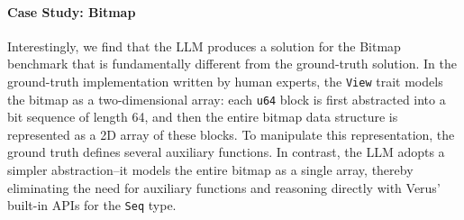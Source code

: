 \paragraph{Case Study: Bitmap}
Interestingly, we find that the LLM produces a solution for the {\sc Bitmap} benchmark that is fundamentally different from the ground-truth solution. In the ground-truth implementation written by human experts, the \texttt{View} trait models the bitmap as a two-dimensional array: each \texttt{u64} block is first abstracted into a bit sequence of length 64, and then the entire bitmap data structure is represented as a 2D array of these blocks. To manipulate this representation, the ground truth defines several auxiliary functions. In contrast, the LLM adopts a simpler abstraction--it models the entire bitmap as a single array, thereby eliminating the need for auxiliary functions and reasoning directly with Verus’ built-in APIs for the \texttt{Seq} type.


